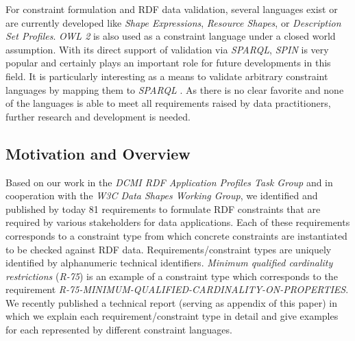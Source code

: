 \documentclass{acm_proc_article-sp}
\begin{document}
For constraint formulation and RDF data validation, several languages exist or are currently developed like \emph{Shape Expressions}, \emph{Resource Shapes}, or \emph{Description Set Profiles}. \emph{OWL 2} is also used as a constraint language under a closed world assumption. With its direct support of validation via \emph{SPARQL}, \emph{SPIN} is very popular and certainly plays an important role for future developments in this field. It is particularly interesting as a means to validate arbitrary constraint languages by mapping them to \emph{SPARQL} \cite{BoschEckert2014-2}. 
As there is no clear favorite and none of the languages is able to meet all requirements raised by data practitioners,
further research and development is needed.

\subsection{Motivation and Overview}
\label{motivation}

Based on our work in the \emph{DCMI RDF Application Profiles Task Group} and in cooperation with the \emph{W3C Data Shapes Working Group}, 
we identified and published by today 81 requirements to formulate RDF constraints that are required by various stakeholders for data applications.
Each of these requirements corresponds to a constraint type from which concrete constraints are instantiated to be checked against RDF data.
Requirements/constraint types are uniquely identified by alphanumeric technical identifiers.
\emph{Minimum qualified cardinality restrictions} (\emph{R-75}) is an example of a constraint type which corresponds to the requirement {\small\emph{R-75-MINIMUM-QUALIFIED-CARDINALITY-ON-PROPERTIES}}. 
We recently published a technical report \cite{BoschNolleAcarEckert2015}
(serving as appendix of this paper) 
in which we explain each requirement/constraint type in detail and give examples for each represented by different constraint languages.
\end{document}
